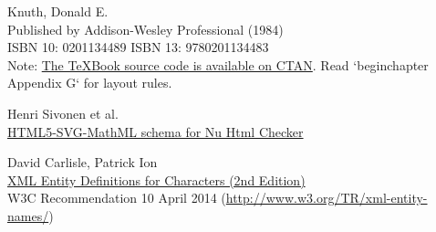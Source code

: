 \begin{thebibliography}{25}
Knuth, Donald E. \\
Published by Addison-Wesley Professional (1984) \\
ISBN 10: 0201134489 ISBN 13: 9780201134483 \\
Note: \href{http://www.ctan.org/pkg/texbook}{The TeXBook source code is
available on CTAN}. Read `beginchapter Appendix G` for layout rules.

Henri Sivonen et al. \\
\href{https://github.com/validator/validator/blob/master/schema/.drivers/html5-svg-mathml.rnc}{HTML5-SVG-MathML schema for Nu Html Checker}

David Carlisle, Patrick Ion \\
\href{http://www.w3.org/TR/xml-entity-names/}{XML Entity Definitions for Characters (2nd Edition)} \\
W3C Recommendation 10 April 2014 (\href{http://www.w3.org/TR/xml-entity-names/}{http://www.w3.org/TR/xml-entity-names/})

\end{thebibliography}
